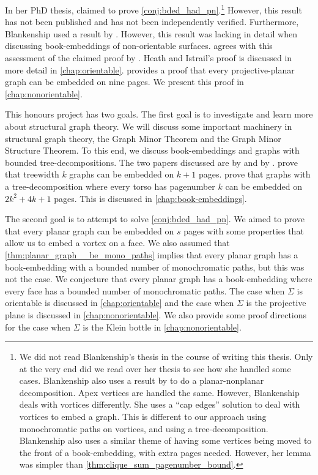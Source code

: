 In her PhD thesis, \textcite{Blankenship-PhD03} claimed to prove \cref{conj:bded_had_pn}.\footnote{
	We did not read Blankenship's thesis in the course of writing this thesis. Only at the very end did we read over her thesis to see how she handled some cases. 
	Blankenship also uses a result by \textcite{heathPagenumberGenusGraphs1992} to do a planar-nonplanar decomposition. Apex vertices are handled the same. However, Blankenship deals with vortices differently. She uses a ``cap edges'' solution to deal with vortices to embed a graph. This is different to our approach using monochromatic paths on vortices, and using a tree-decomposition. 
	Blankenship also uses a similar theme of having some vertices being moved to the front of a book-embedding, with extra pages needed. However, her lemma was simpler than \cref{thm:clique_sum_pagenumber_bound}. 
}
However, this result has not been published and has not been independently verified. Furthermore, Blankenship used a result by \textcite{heathPagenumberGenusGraphs1992}. However, this result was lacking in detail when discussing book-embeddings of non-orientable surfaces. \textcite{nakamotoBookEmbeddingProjectiveplanar2015} agrees with this assessment of the claimed proof by \textcite{heathPagenumberGenusGraphs1992}. Heath and Istrail's proof is discussed in more detail in \cref{chap:orientable}. \textcite{nakamotoBookEmbeddingProjectiveplanar2015} provides a proof that every projective-planar graph can be embedded on nine pages. We present this proof in \cref{chap:nonorientable}. 

This honours project has two goals. The first goal is to investigate and learn more about structural graph theory. We will discuss some important machinery in structural graph theory, the Graph Minor Theorem and the Graph Minor Structure Theorem. To this end, we discuss book-embeddings and graphs with bounded tree-decompositions. The two papers discussed are by \textcite{hickingbothamStackNumberCliqueSum2023} and by \textcite{ganleyPagenumberTrees2001}. \textcite{ganleyPagenumberTrees2001} prove that treewidth $k$ graphs can be embedded on $k+1$ pages. \textcite{hickingbothamStackNumberCliqueSum2023} prove that graphs with a tree-decomposition where every torso has pagenumber $k$ can be embedded on $2k^2 + 4k + 1$ pages. This is discussed in \cref{chap:book-embeddings}.

The second goal is to attempt to solve \cref{conj:bded_had_pn}. We aimed to prove that every planar graph can be embedded on $s$ pages with some properties that allow us to embed a vortex on a face. We also assumed that \cref{thm:planar_graph__be_mono_paths} implies that every planar graph has a book-embedding with a bounded number of monochromatic paths, but this was not the case. We conjecture that every planar graph has a book-embedding where every face has a bounded number of monochromatic paths. The case when $\Sigma$ is orientable is discussed in \cref{chap:orientable} and the case when $\Sigma$ is the projective plane is discussed in \cref{chap:nonorientable}. We also provide some proof directions for the case when $\Sigma$ is the Klein bottle in \cref{chap:nonorientable}. 

